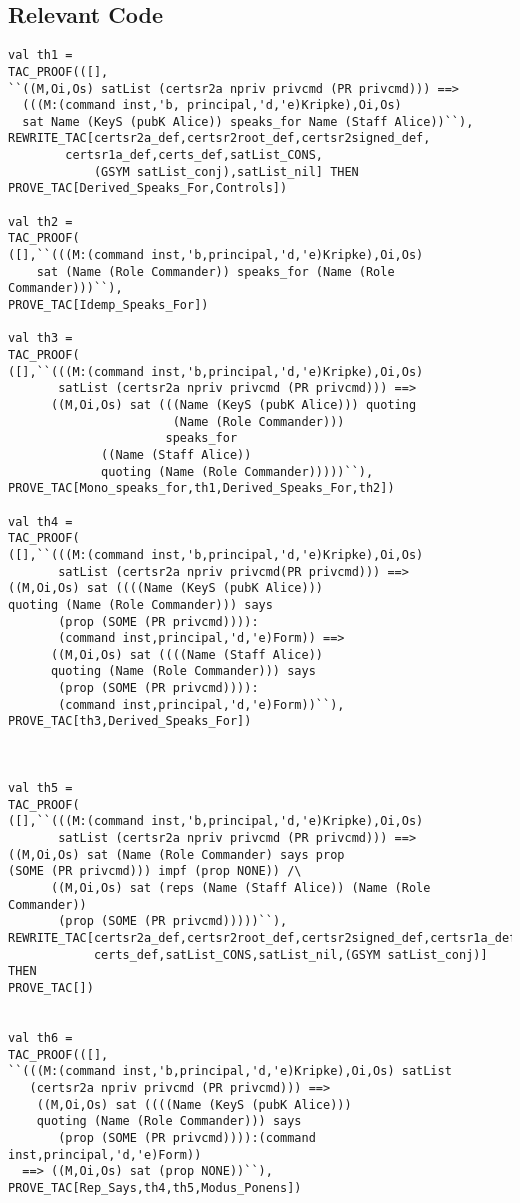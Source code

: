 \documentclass{report}
\begin{document}
\subsection{Relevant Code}
\label{rel-code-1}
\begin{lstlisting}[frame=TBlr]
val th1 =
TAC_PROOF(([],
``((M,Oi,Os) satList (certsr2a npriv privcmd (PR privcmd))) ==>
  (((M:(command inst,'b, principal,'d,'e)Kripke),Oi,Os)
  sat Name (KeyS (pubK Alice)) speaks_for Name (Staff Alice))``),
REWRITE_TAC[certsr2a_def,certsr2root_def,certsr2signed_def,
	    certsr1a_def,certs_def,satList_CONS,
            (GSYM satList_conj),satList_nil] THEN
PROVE_TAC[Derived_Speaks_For,Controls])

val th2 =
TAC_PROOF(
([],``(((M:(command inst,'b,principal,'d,'e)Kripke),Oi,Os)
	sat (Name (Role Commander)) speaks_for (Name (Role Commander)))``),
PROVE_TAC[Idemp_Speaks_For])		

val th3 =
TAC_PROOF(
([],``(((M:(command inst,'b,principal,'d,'e)Kripke),Oi,Os)
       satList (certsr2a npriv privcmd (PR privcmd))) ==>
      ((M,Oi,Os) sat (((Name (KeyS (pubK Alice))) quoting
                       (Name (Role Commander)))
                      speaks_for
		     ((Name (Staff Alice))
		     quoting (Name (Role Commander)))))``),
PROVE_TAC[Mono_speaks_for,th1,Derived_Speaks_For,th2])

val th4 =
TAC_PROOF(
([],``(((M:(command inst,'b,principal,'d,'e)Kripke),Oi,Os)
       satList (certsr2a npriv privcmd(PR privcmd))) ==>
((M,Oi,Os) sat ((((Name (KeyS (pubK Alice)))
quoting (Name (Role Commander))) says
       (prop (SOME (PR privcmd)))):
       (command inst,principal,'d,'e)Form)) ==>
      ((M,Oi,Os) sat ((((Name (Staff Alice))
      quoting (Name (Role Commander))) says
       (prop (SOME (PR privcmd)))):
       (command inst,principal,'d,'e)Form))``),
PROVE_TAC[th3,Derived_Speaks_For])



val th5 =
TAC_PROOF(
([],``(((M:(command inst,'b,principal,'d,'e)Kripke),Oi,Os)
       satList (certsr2a npriv privcmd (PR privcmd))) ==>
((M,Oi,Os) sat (Name (Role Commander) says prop
(SOME (PR privcmd))) impf (prop NONE)) /\
      ((M,Oi,Os) sat (reps (Name (Staff Alice)) (Name (Role Commander))
       (prop (SOME (PR privcmd)))))``),
REWRITE_TAC[certsr2a_def,certsr2root_def,certsr2signed_def,certsr1a_def,
            certs_def,satList_CONS,satList_nil,(GSYM satList_conj)] THEN
PROVE_TAC[])	    


val th6 =
TAC_PROOF(([],
``(((M:(command inst,'b,principal,'d,'e)Kripke),Oi,Os) satList
   (certsr2a npriv privcmd (PR privcmd))) ==>
    ((M,Oi,Os) sat ((((Name (KeyS (pubK Alice)))
    quoting (Name (Role Commander))) says
       (prop (SOME (PR privcmd)))):(command inst,principal,'d,'e)Form))
  ==> ((M,Oi,Os) sat (prop NONE))``),
PROVE_TAC[Rep_Says,th4,th5,Modus_Ponens])


\end{lstlisting}
\end{document}
